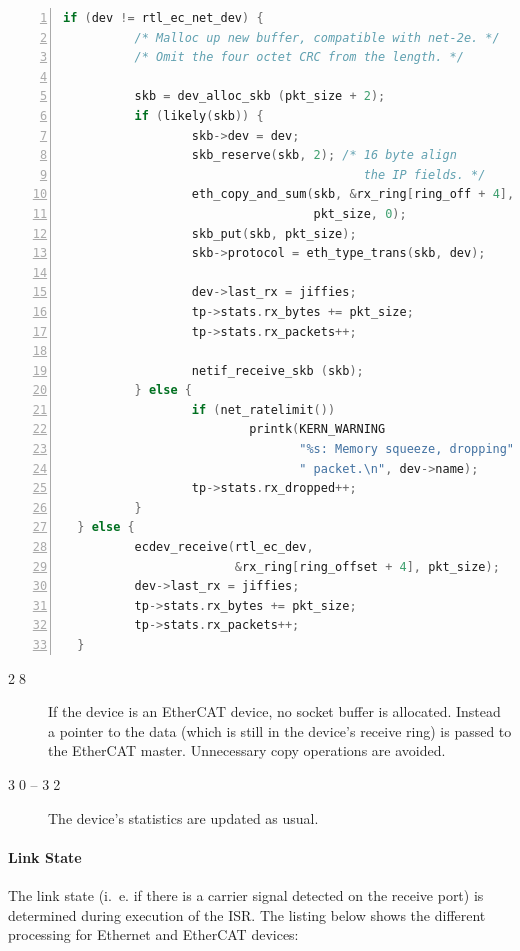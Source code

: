 \documentclass[a4paper,12pt,BCOR6mm,bibtotoc,idxtotoc]{scrbook}
\begin{document}
\begin{lstlisting}[language=C,numbers=left]
  if (dev != rtl_ec_net_dev) {
          /* Malloc up new buffer, compatible with net-2e. */
          /* Omit the four octet CRC from the length. */

          skb = dev_alloc_skb (pkt_size + 2);
          if (likely(skb)) {
                  skb->dev = dev;
                  skb_reserve(skb, 2); /* 16 byte align
                                          the IP fields. */
                  eth_copy_and_sum(skb, &rx_ring[ring_off + 4],
                                   pkt_size, 0);
                  skb_put(skb, pkt_size);
                  skb->protocol = eth_type_trans(skb, dev);

                  dev->last_rx = jiffies;
                  tp->stats.rx_bytes += pkt_size;
                  tp->stats.rx_packets++;

                  netif_receive_skb (skb);
          } else {
                  if (net_ratelimit())
                          printk(KERN_WARNING
                                 "%s: Memory squeeze, dropping"
                                 " packet.\n", dev->name);
                  tp->stats.rx_dropped++;
          }
  } else {
          ecdev_receive(rtl_ec_dev,
                        &rx_ring[ring_offset + 4], pkt_size);
          dev->last_rx = jiffies;
          tp->stats.rx_bytes += pkt_size;
          tp->stats.rx_packets++;
  }
\end{lstlisting}

\begin{description}
\item[\normalfont\textcircled{\tiny 28}] If the device is an EtherCAT
  device, no socket buffer is allocated. Instead a pointer to the data
  (which is still in the device's receive ring) is passed to the
  EtherCAT master. Unnecessary copy operations are avoided.
\item[\normalfont\textcircled{\tiny 30} -- \textcircled{\tiny 32}] The
  device's statistics are updated as usual.
\end{description}

\paragraph{Link State}

The link state (i.~e. if there is a carrier signal detected on the
receive port) is determined during execution of the ISR. The listing
below shows the different processing for Ethernet and EtherCAT
devices:
\end{document}
